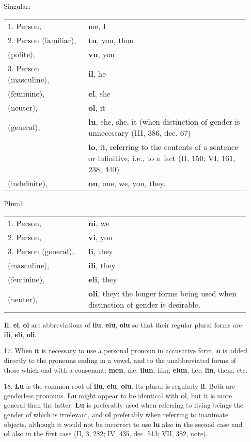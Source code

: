 \Centering Singular:  \\ \justifying 
\begin{tabular}{p{0.33\linewidth} p{0.66\linewidth}}
1. Person, & me, I \\
2. Person (familiar), & \textbf{tu}, you, thou \\
\phantom{2. Person} (polite), & \textbf{vu}, you \\
3. Person (masculine), & \textbf{il}, he \\
\phantom{3. Person} (feminine), & \textbf{el}, she \\
\phantom{3. Person} (neuter), & \textbf{ol}, it \\
\phantom{3. Person} (general), & \textbf{lu}, she, she, it (when distinction of gender is unnecessary (III, 386, dec. 67) \\
& \textbf{lo}, it, referring to the contents of a sentence or infinitive, i.e., to a fact (II, 150; VI, 161, 238, 440) \\
\phantom{3. Person} (indefinite), & \textbf{on}, one, we, you, they.
\end{tabular}
\begin{center}Plural:\end{center} \vspace{-1em}
\begin{tabular}{p{0.33\linewidth} p{0.66\linewidth}}
1. Person, & \textbf{ni}, we \\
2. Person, & \textbf{vi}, you \\
3. Person (general), & \textbf{li}, they \\
\phantom{3. Person} (masculine), & \textbf{ili}, they \\
\phantom{3. Person} (feminine), & \textbf{eli}, they \\
\phantom{3. Person} (neuter), & \textbf{oli}, they: the longer forms being used when distinction of gender is desirable.
\end{tabular}
\textbf{Il}, \textbf{el}, \textbf{ol} are abbreviations of \textbf{ilu}, \textbf{elu}, \textbf{olu} so that their regular plural forms are \textbf{ili}, \textbf{eli}, \textbf{oli}.

17. When it is necessary to use a personal pronoun in accusative form, \textbf{n} is added directly to the pronouns ending in a vowel, and to the unabbreviated forms of those which end with a consonant: \textbf{men}, me; \textbf{ilun}, him; \textbf{elun}, her; \textbf{lin}, them; etc.

18. \textbf{Lu} is the common root of \textbf{ilu}, \textbf{elu}, \textbf{olu}. Its plural is regularly \textbf{li}. Both are genderless pronouns. \textbf{Lu} might appear to be identical with \textbf{ol}, but it is more general than the latter. \textbf{Lu} is preferably used when referring to living beings the gender of which is irrelevant, and \textbf{ol} preferably when referring to inanimate objects, although it would not be incorrect to use \textbf{lu} also in the second case and \textbf{ol} also in the first case (II, 3, 282; IV, 435, dec. 513; VII, 382, note). 

